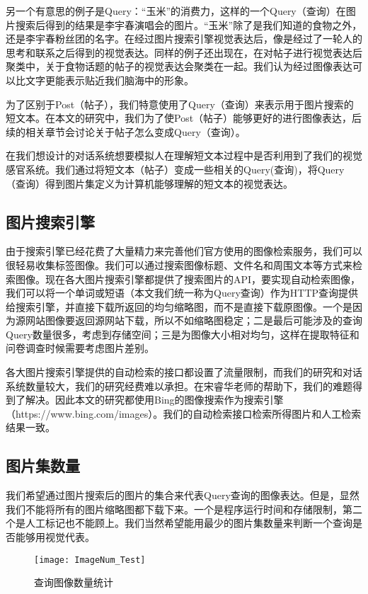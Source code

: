 另一个有意思的例子是Query：“玉米”的消费力，这样的一个Query（查询）在图片搜索后得到的结果是李宇春演唱会的图片。“玉米”除了是我们知道的食物之外，还是李宇春粉丝团的名字。在经过图片搜索引擎视觉表达后，像是经过了一轮人的思考和联系之后得到的视觉表达。同样的例子还出现在，在对帖子进行视觉表达后聚类中，关于食物话题的帖子的视觉表达会聚类在一起。我们认为经过图像表达可以比文字更能表示贴近我们脑海中的形象。

为了区别于Post（帖子），我们特意使用了Query（查询）来表示用于图片搜索的短文本。在本文的研究中，我们为了使Post（帖子）能够更好的进行图像表达，后续的相关章节会讨论关于帖子怎么变成Query（查询）。

在我们想设计的对话系统想要模拟人在理解短文本过程中是否利用到了我们的视觉感官系统。我们通过将短文本（帖子）变成一些相关的Query(查询)，将Query（查询）得到图片集定义为计算机能够理解的短文本的视觉表达。

\subsection{图片搜索引擎}
由于搜索引擎已经花费了大量精力来完善他们官方使用的图像检索服务，我们可以很轻易收集标签图像。我们可以通过搜索图像标题、文件名和周围文本等方式来检索图像。现在各大图片搜索引擎都提供了搜索图片的API，要实现自动检索图像，我们可以将一个单词或短语（本文我们统一称为Query查询）作为HTTP查询提供给搜索引擎，并直接下载所返回的均匀缩略图，而不是直接下载原图像。一个是因为源网站图像要返回源网站下载，所以不如缩略图稳定；二是最后可能涉及的查询Query数量很多，考虑到存储空间；三是为图像大小相对均匀，这样在提取特征和问卷调查时候需要考虑图片差别。

各大图片搜索引擎提供的自动检索的接口都设置了流量限制，而我们的研究和对话系统数量较大，我们的研究经费难以承担。在宋睿华老师的帮助下，我们的难题得到了解决。因此本文的研究都使用Bing的图像搜索作为搜索引擎（https://www.bing.com/images）。我们的自动检索接口检索所得图片和人工检索结果一致。

\subsection{图片集数量}

我们希望通过图片搜索后的图片的集合来代表Query查询的图像表达。但是，显然我们不能将所有的图片缩略图都下载下来。一个是程序运行时间和存储限制，第二个是人工标记也不能顾上。我们当然希望能用最少的图片集数量来判断一个查询是否能够用视觉代表。

\begin{figure}[ht]
\centering
\texttt{[image: ImageNum\_Test]}
\caption{查询图像数量统计} \label{fig:ImageNum_Test}
\end{figure}

